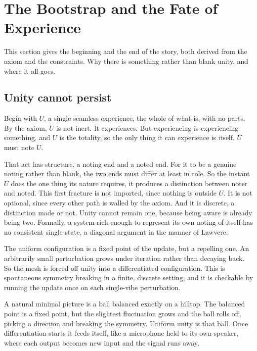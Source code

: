 \section{The Bootstrap and the Fate of Experience}
\label{sec:emergence}

This section gives the beginning and the end of the story, both derived from the axiom and the constraints. Why there is something rather than blank unity, and where it all goes.

\subsection{Unity cannot persist}

Begin with $U$, a single seamless experience, the whole of what-is, with no parts. By the axiom, $U$ is not inert. It experiences. But experiencing is experiencing something, and $U$ is the totality, so the only thing it can experience is itself. $U$ must note $U$.

That act has structure, a noting end and a noted end. For it to be a genuine noting rather than blank, the two ends must differ at least in role. So the instant $U$ does the one thing its nature requires, it produces a distinction between noter and noted. This first fracture is not imported, since nothing is outside $U$. It is not optional, since every other path is walled by the axiom. And it is discrete, a distinction made or not. Unity cannot remain one, because being aware is already being two. Formally, a system rich enough to represent its own noting of itself has no consistent single state, a diagonal argument in the manner of Lawvere.

\begin{proposition}
The uniform configuration is a fixed point of the update, but a repelling one. An arbitrarily small perturbation grows under iteration rather than decaying back. So the mesh is forced off unity into a differentiated configuration. This is spontaneous symmetry breaking in a finite, discrete setting, and it is checkable by running the update once on each single-vibe perturbation.
\end{proposition}

A natural minimal picture is a ball balanced exactly on a hilltop. The balanced point is a fixed point, but the slightest fluctuation grows and the ball rolls off, picking a direction and breaking the symmetry. Uniform unity is that ball. Once differentiation starts it feeds itself, like a microphone held to its own speaker, where each output becomes new input and the signal runs away.


